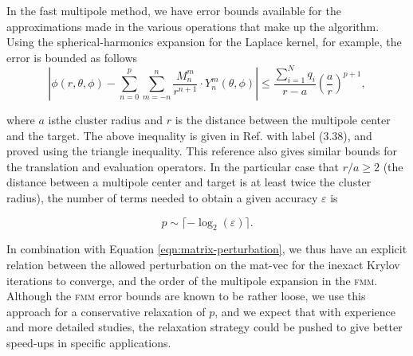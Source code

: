 \documentclass[final,3p,times]{elsarticle}
\newcommand{\fmm}{\textsc{fmm}\xspace}
\begin{document}
In the fast multipole method, we have error bounds available for the approximations made in the various operations that make up the algorithm. Using the spherical-harmonics expansion for the Laplace kernel, for example, the error is bounded as follows 
%
\begin{equation}\label{eqn:multipole_error}
	\left | \phi(r, \theta, \phi) - \sum_{n=0}^{p}\sum_{m=-n}^{n}\frac{M^{m}_{n}}{r^{n+1}}\cdot Y^{m}_{n}(\theta, \phi) \right | \leq \frac{\sum_{i=1}^{N}q_{i}}{r-a}\left ( \frac{a}{r} \right )^{p+1},
\end{equation}

\noindent where $a$ isthe  cluster radius and $r$ is the distance between the multipole center and the target. The above inequality is given in Ref. \cite[p.~55]{greengard1987} with label (3.38), and proved using the triangle inequality. This reference also gives similar bounds for the translation and evaluation operators. In the particular case that $r/a\geq 2$ (the distance between a multipole center and target is at least twice the cluster radius), the number of terms needed to obtain a given accuracy $\varepsilon$ is 

\begin{equation}\label{eqn:fmm_p}
	p \sim \lceil -\log_{2}(\varepsilon) \rceil.
\end{equation}

\noindent In combination with Equation \eqref{eqn:matrix-perturbation}, we thus have an explicit  relation between the allowed perturbation on the mat-vec for the inexact Krylov iterations to converge, and the order of the multipole expansion in the \fmm.
Although the \fmm error bounds are known to be rather loose, we use this approach for a conservative relaxation of $p$, and we expect that with experience and more detailed studies, the relaxation strategy could be pushed to give better speed-ups in specific applications.


\end{document}

